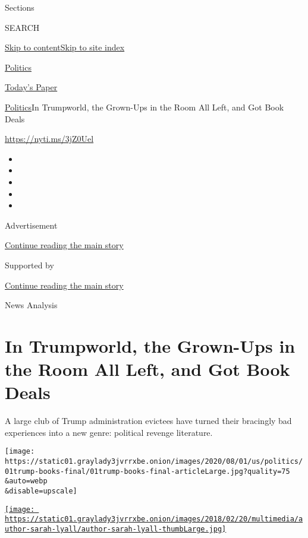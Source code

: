 Sections

SEARCH

\protect\hyperlink{site-content}{Skip to
content}\protect\hyperlink{site-index}{Skip to site index}

\href{https://www.nytimes3xbfgragh.onion/section/politics}{Politics}

\href{https://myaccount.nytimes3xbfgragh.onion/auth/login?response_type=cookie\&client_id=vi}{}

\href{https://www.nytimes3xbfgragh.onion/section/todayspaper}{Today's
Paper}

\href{/section/politics}{Politics}\textbar{}In Trumpworld, the Grown-Ups
in the Room All Left, and Got Book Deals

\url{https://nyti.ms/3jZ0Uel}

\begin{itemize}
\item
\item
\item
\item
\item
\end{itemize}

Advertisement

\protect\hyperlink{after-top}{Continue reading the main story}

Supported by

\protect\hyperlink{after-sponsor}{Continue reading the main story}

News Analysis

\hypertarget{in-trumpworld-the-grown-ups-in-the-room-all-left-and-got-book-deals}{%
\section{In Trumpworld, the Grown-Ups in the Room All Left, and Got Book
Deals}\label{in-trumpworld-the-grown-ups-in-the-room-all-left-and-got-book-deals}}

A large club of Trump administration evictees have turned their
bracingly bad experiences into a new genre: political revenge
literature.

\texttt{[image: https://static01.graylady3jvrrxbe.onion/images/2020/08/01/us/politics/01trump-books-final/01trump-books-final-articleLarge.jpg?quality=75\\\&auto=webp\\\&disable=upscale]}

\href{https://www.nytimes3xbfgragh.onion/by/sarah-lyall}{\texttt{[image: https://static01.graylady3jvrrxbe.onion/images/2018/02/20/multimedia/author-sarah-lyall/author-sarah-lyall-thumbLarge.jpg]}}


